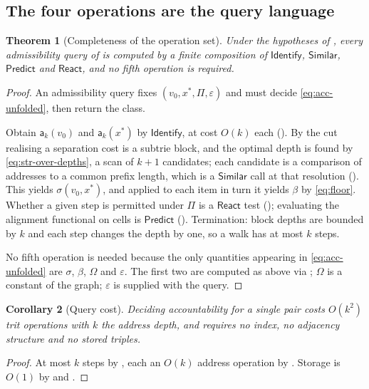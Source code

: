 \documentclass[11pt,twocolumn,a4paper]{article}
\theoremstyle{thmstyle}
\newtheorem{theorem}{Theorem}[section]
\newtheorem{corollary}[theorem]{Corollary}
\theoremstyle{definition}
\theoremstyle{remark}
\newcommand{\flo}{\beta}
\newcommand{\str}{\sigma}
\newcommand{\Proc}{\Pi}
\newcommand{\addr}{\mathsf{a}}
\newcommand{\eps}{\varepsilon}
\begin{document}
\subsection{The four operations are the query language}

\begin{theorem}[Completeness of the operation set]
\label{thm:query-complete}
Under the hypotheses of , every admissibility query
of  is computed by a finite composition of
$\textsf{Identify}$, $\textsf{Similar}$, $\textsf{Predict}$ and
$\textsf{React}$, and no fifth operation is required.
\end{theorem}

\begin{proof}
An admissibility query fixes $(v_0, x^{*}, \Proc, \eps)$ and must
decide \eqref{eq:acc-unfolded}, then return the class.

Obtain $\addr_k(v_0)$ and $\addr_k(x^{*})$ by $\textsf{Identify}$, at
cost $O(k)$ each (). By
 the cut realising a separation cost is a
subtrie block, and the optimal depth is found by
\eqref{eq:str-over-depths}, a scan of $k+1$ candidates; each candidate
is a comparison of addresses to a common prefix length, which is a
$\textsf{Similar}$ call at that resolution (). This
yields $\str(v_0,x^{*})$, and applied to each item in turn it yields
$\flo$ by \eqref{eq:floor}. Whether a given step is permitted under
$\Proc$ is a $\textsf{React}$ test (); evaluating the
alignment functional on cells is $\textsf{Predict}$
(). Termination: block depths are bounded by $k$ and
each step changes the depth by one, so a walk has at most $k$ steps.

No fifth operation is needed because the only quantities appearing in
\eqref{eq:acc-unfolded} are $\str$, $\flo$, $\Omega$ and $\eps$. The
first two are computed as above via ; $\Omega$
is a constant of the graph; $\eps$ is supplied with the query.
\end{proof}

\begin{corollary}[Query cost]
\label{cor:query-cost}
Deciding accountability for a single pair costs $O(k^2)$ trit
operations with $k$ the address depth, and requires no index, no
adjacency structure and no stored triples.
\end{corollary}

\begin{proof}
At most $k$ steps by , each an $O(k)$ address
operation by . Storage is $O(1)$ by
 and .
\end{proof}
\end{document}
